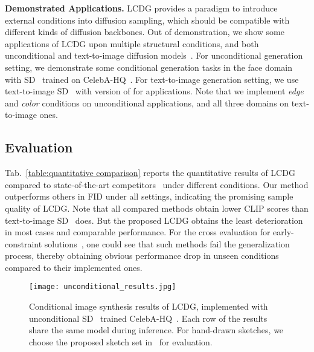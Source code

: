\documentclass{article}
\begin{document}
\textbf{Demonstrated Applications.} LCDG provides a paradigm to introduce external conditions into diffusion sampling, which should be compatible with different kinds of diffusion backbones. Out of demonstration, we show some applications of LCDG upon multiple structural conditions, and both unconditional and text-to-image diffusion models~\cite{rombach2022high}. For unconditional generation setting, we demonstrate some conditional generation tasks in the face domain with SD~\cite{rombach2022high} trained on CelebA-HQ~\cite{karras2017progressive}. For text-to-image generation setting, we use text-to-image SD~\cite{rombach2022high} with version of  for applications. Note that we implement \textit{edge} and \textit{color} conditions on unconditional applications, and all three domains on text-to-image ones.

\subsection{Evaluation}



Tab.~\ref{table:quantitative comparison} reports the quantitative results of LCDG compared to state-of-the-art competitors~\cite{wang2022pretraining, zhang2023adding, mou2023t2i, rombach2022high} under different conditions. Our method outperforms others in FID \cite{NIPS2017_8a1d6947} under all settings, indicating the promising sample quality of LCDG. Note that all compared methods obtain lower CLIP scores than text-to-image SD~\cite{rombach2022high} does. But the proposed LCDG obtains the least deterioration in most cases and comparable performance. For the cross evaluation for early-constraint solutions~\cite{rombach2022high,mou2023t2i}, one could see that such methods fail the generalization process, thereby obtaining obvious performance drop in unseen conditions compared to their implemented ones.

\begin{figure*}[t!]
  \centering
  \texttt{[image: unconditional\_results.jpg]} \vspace{-1em}
  \caption{Conditional image synthesis results of LCDG, implemented with unconditional SD~\cite{rombach2022high} trained CelebA-HQ~\cite{karras2017progressive}. Each row of the results share the same model during inference. For hand-drawn sketches, we choose the proposed sketch set in~\cite{yang2020deep} for evaluation.}
  \label{figure:unconditional results}
  \vspace{-0.5em}  
\end{figure*}
  
\end{document}
